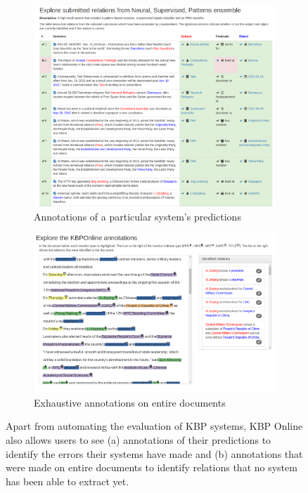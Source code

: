 \begin{figure}
  \centering
  \begin{subfigure}{0.7\textwidth}
    \includegraphics[width=\textwidth]{figures/interface/errors}
    \caption{\label{fig:kbpo:prediction-errors} Annotations of a particular system's predictions}
  \end{subfigure}

  \begin{subfigure}{0.7\textwidth}
    \includegraphics[width=\textwidth]{figures/interface/explore-data}
    \caption{\label{fig:kbpo:explore} Exhaustive annotations on entire documents}
  \end{subfigure}

  \caption[Features of KBP Online]{\label{fig:kbpo:kbpo-features}
  Apart from automating the evaluation of KBP systems, KBP Online also allows users to see (a) annotations of their predictions to identify the errors their systems have made and (b) annotations that were made on entire documents to identify relations that no system has been able to extract yet.
  }
\end{figure}


